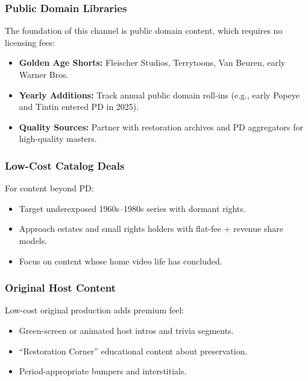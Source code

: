 \documentclass[12pt,letterpaper,twoside]{report}
\begin{document}
\subsubsection{Public Domain Libraries}

The foundation of this channel is public domain content, which requires no licensing fees:

\begin{itemize}[leftmargin=1.5cm]
    \item \textbf{Golden Age Shorts:} Fleischer Studios, Terrytoons, Van Beuren, early Warner Bros.
    \item \textbf{Yearly Additions:} Track annual public domain roll-ins (e.g., early Popeye and Tintin entered PD in 2025).
    \item \textbf{Quality Sources:} Partner with restoration archives and PD aggregators for high-quality masters.
\end{itemize}

\subsubsection{Low-Cost Catalog Deals}

For content beyond PD:

\begin{itemize}[leftmargin=1.5cm]
    \item Target underexposed 1960s--1980s series with dormant rights.
    \item Approach estates and small rights holders with flat-fee + revenue share models.
    \item Focus on content whose home video life has concluded.
\end{itemize}

\subsubsection{Original Host Content}

Low-cost original production adds premium feel:

\begin{itemize}[leftmargin=1.5cm]
    \item Green-screen or animated host intros and trivia segments.
    \item ``Restoration Corner'' educational content about preservation.
    \item Period-appropriate bumpers and interstitials.
\end{itemize}
\end{document}
